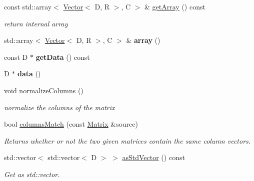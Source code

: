 \begin{Indent}
\begin{DoxyCompactItemize}
const std\+::array$<$ \mbox{\hyperlink{classrev_1_1_vector}{Vector}}$<$ D, R $>$, C $>$ \& \mbox{\hyperlink{classrev_1_1_matrix_a00221a77493da4c84afb88a1360c62d8}{get\+Array}} () const
\begin{DoxyCompactList}\small\item\em return internal array \end{DoxyCompactList}\item 
\mbox{\label{classrev_1_1_matrix_a5e5eb20c5791117b78e2eb8d060f545f}} 
std\+::array$<$ \mbox{\hyperlink{classrev_1_1_vector}{Vector}}$<$ D, R $>$, C $>$ \& {\bfseries array} ()
\item 
\mbox{\label{classrev_1_1_matrix_a98bd2813d4f448fb5191b7e315fea381}} 
const D $\ast$ {\bfseries get\+Data} () const
\item 
\mbox{\label{classrev_1_1_matrix_a959e129ac237039a94000a95ab0dbfe6}} 
D $\ast$ {\bfseries data} ()
\item 
\mbox{\label{classrev_1_1_matrix_a4172cd4018dfd0ed53fe81557bae3d52}} 
void \mbox{\hyperlink{classrev_1_1_matrix_a4172cd4018dfd0ed53fe81557bae3d52}{normalize\+Columns}} ()
\begin{DoxyCompactList}\small\item\em normalize the columns of the matrix \end{DoxyCompactList}\item 
bool \mbox{\hyperlink{classrev_1_1_matrix_a323a777d775cc672a918ee57efbba10d}{columns\+Match}} (const \mbox{\hyperlink{classrev_1_1_matrix}{Matrix}} \&source)
\begin{DoxyCompactList}\small\item\em Returns whether or not the two given matrices contain the same column vectors. \end{DoxyCompactList}\item 
\mbox{\label{classrev_1_1_matrix_af29efc9d926de7c3e8d6a49ff1ccfb4f}} 
std\+::vector$<$ std\+::vector$<$ D $>$ $>$ \mbox{\hyperlink{classrev_1_1_matrix_af29efc9d926de7c3e8d6a49ff1ccfb4f}{as\+Std\+Vector}} () const
\begin{DoxyCompactList}\small\item\em Get as std\+::vector. \end{DoxyCompactList}\end{DoxyCompactItemize}
\end{Indent}
